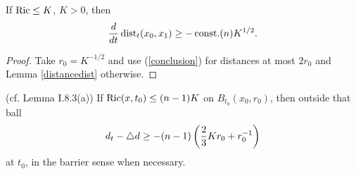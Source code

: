 \begin{corollary}
  \label{cor:kl-length-distortion-estimates-estimates-length-distortion-estimates}
  \label{bound1}
  \cite[Theorem 17.2]{Hamilton}
If $\operatorname{Ric}\le K$, $K>0$, then
\begin{equation}{d\over dt}\operatorname{dist}_t(x_0,x_1)\ge-\operatorname{const.}(n)K^{1/2}.\end{equation}
\end{corollary}
\begin{proof}
\sketch
Take $r_0=K^{-1/2}$ and use (\ref{conclusion}) for distances at most $2r_0$ and
Lemma \ref{distancedist} otherwise.
\end{proof}
\begin{lemma}
  \label{lem:kl-length-distortion-estimates-estimates-distance-distortion}
  (cf. Lemma I.8.3(a)) \label{I.8.3a}
If $\operatorname{Ric}(x,t_0)\le(n-1)K$ on $B_{t_0}(x_0,r_0)$, then outside that ball
\begin{equation}d_t-\triangle d\ge-(n-1)\left({2\over3}Kr_0+r_0^{-1}\right)
\end{equation}
at $t_0$, in the barrier sense when necessary.
\end{lemma}

